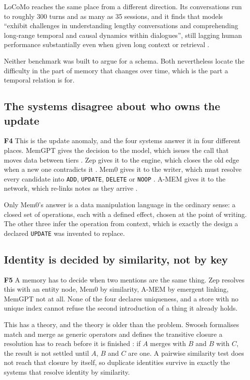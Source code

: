 \documentclass[11pt,a4paper]{article}
\newcommand{\code}[1]{\texttt{\small #1}}
\newcommand{\finding}[1]{{\sffamily\bfseries\color{blue800}#1}\quad}
\begin{document}
LoCoMo reaches the same place from a different direction. Its
conversations run to roughly 300 turns and as many as 35 sessions, and it
finds that models ``exhibit challenges in understanding lengthy
conversations and comprehending long-range temporal and causal dynamics
within dialogues'', still lagging human performance substantially even
when given long context or retrieval \cite{locomo}.

Neither benchmark was built to argue for a schema. Both nevertheless
locate the difficulty in the part of memory that changes over time, which
is the part a temporal relation is for.

\subsection{The systems disagree about who owns the update}
\label{sec:f4}

\finding{F4} This is the update anomaly, and the four systems answer it
in four different places. MemGPT gives the decision to the model, which
issues the call that moves data between tiers \cite{memgpt}. Zep gives it
to the engine, which closes the old edge when a new one contradicts it
\cite{zep}. Mem0 gives it to the writer, which must resolve every
candidate into \code{ADD}, \code{UPDATE}, \code{DELETE} or \code{NOOP}
\cite{mem0}. A-MEM gives it to the network, which re-links notes as they
arrive \cite{amem}.

Only Mem0's answer is a data manipulation language in the ordinary sense:
a closed set of operations, each with a defined effect, chosen at the
point of writing. The other three infer the operation from context, which
is exactly the design a declared \code{UPDATE} was invented to replace.

\subsection{Identity is decided by similarity, not by key}
\label{sec:f5}

\finding{F5} A memory has to decide when two mentions are the same thing.
Zep resolves this with an entity node, Mem0 by similarity, A-MEM by
emergent linking, MemGPT not at all. None of the four declares
uniqueness, and a store with no unique index cannot refuse the second
introduction of a thing it already holds.

This has a theory, and the theory is older than the problem. Swoosh
formalises match and merge as generic operators and defines the
transitive closure a resolution has to reach before it is finished
\cite{swoosh}: if $A$ merges with $B$ and $B$ with $C$, the result is not
settled until $A$, $B$ and $C$ are one. A pairwise similarity test does
not reach that closure by itself, so duplicate identities survive in
exactly the systems that resolve identity by similarity.
\end{document}
